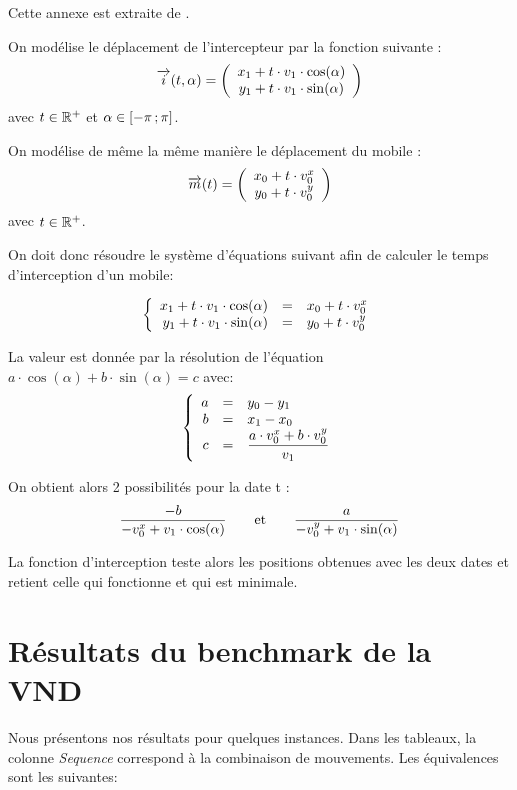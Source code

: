 	Cette annexe est extraite de \cite{projet-zz1}.

	On modélise le déplacement de l'intercepteur par la fonction suivante : 
	\[
	\overrightarrow{i}(t,\alpha) = 
	\left(
	\begin{array}{c}
	 x_1 + t \cdot v_1 \cdot \cos(\alpha)\\
	 y_1 + t \cdot v_1 \cdot \sin(\alpha)
	\end{array}
	\right)
	\]
	avec $t \in \mathbb{R}^+$ et $\alpha \in \mathopen{[}-\pi\mathclose{}\mathpunct{};\pi\mathclose{]}$.

	On modélise de même la même manière le déplacement du mobile :
	\[
	\overrightarrow{m}(t) = 
	\left(
	\begin{array}{c}
	 x_0 + t \cdot v^{x}_0\\
	 y_0 + t \cdot v^{y}_0
	\end{array}
	\right)
	\]
	avec $t \in \mathbb{R}^+$.

	On doit donc résoudre le système d'équations suivant afin de calculer le temps d'interception d'un mobile:

	\[
	\left\{
	\begin{array}{r c l}
	x_1 + t \cdot v_1 \cdot \cos(\alpha) &=& x_0 + t \cdot v^{x}_0\\
	y_1 + t \cdot v_1 \cdot \sin(\alpha) &=& y_0 + t \cdot v^{y}_0
	\end{array}
	\right.
	\]

	La valeur est donnée par la résolution de l'équation $a \cdot \cos(\alpha)+b \cdot \sin(\alpha) = c$ avec:
	\[
	\left\{
	\begin{array}{r c l}
	a &=& y_0 - y_1\\
	b &=& x_1 - x_0\\
	c &=& \displaystyle \frac{a \cdot v^{x}_0 +b \cdot v^{y}_0}{v_1}
	\end{array}
	\right.
	\]

	On obtient alors 2 possibilités pour la date t : 
	\[ \frac{-b}{-v^{x}_0 + v_1 \cdot \cos(\alpha)}  \qquad\text{et}\qquad \frac{a}{-v^{y}_0 + v_1 \cdot \sin(\alpha)} \]

	La fonction d'interception teste alors les positions obtenues avec les deux dates et retient celle qui fonctionne et qui est minimale.
	
\chapter{Résultats du benchmark de la VND}
\label{ann:benchmark-vnd}
	Nous présentons nos résultats pour quelques instances. Dans les tableaux, la colonne \emph{Sequence} correspond à la combinaison de mouvements. Les équivalences sont les suivantes:

